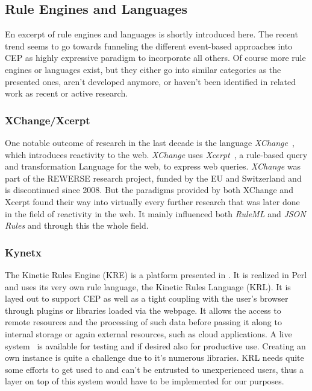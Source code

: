 \documentclass[11pt]{article}%
\begin{document}
\subsection{Rule Engines and Languages}
En excerpt of rule engines and languages is shortly introduced here. The recent trend seems to go towards funneling the different event-based approaches into CEP as highly expressive paradigm to incorporate all others. Of course more rule engines or languages exist, but they either go into similar categories as the presented ones, aren't developed anymore, or haven't been identified in related work as recent or active research.

\subsubsection{XChange/Xcerpt}
One notable outcome of research in the last decade is the language \emph{XChange}~\cite{2005-Patranjan-TLE.pdf,2005-Bry_etal-XChange.pdf}, which introduces reactivity to the web. \emph{XChange} uses \emph{Xcerpt}~\cite{2004-Schaffert-Xcerpt.pdf}, a rule-based query and transformation Language for the web, to express web queries.
\emph{XChange} was part of the REWERSE research project, funded by the EU and Switzerland and is discontinued since 2008. But the paradigms provided by both XChange and Xcerpt found their way into virtually every further research that was later done in the field of reactivity in the web. It mainly influenced both \emph{RuleML} and \emph{JSON Rules} and through this the whole field. 

\subsubsection{Kynetx}
The Kinetic Rules Engine (KRE) is a platform presented in \cite{bookTheLiveWeb}. It is realized in Perl and uses its very own rule language, the Kinetic Rules Language (KRL). It is layed out to support CEP as well as a tight coupling with the user's browser through plugins or libraries loaded via the webpage. It allows the access to remote resources and the processing of such data before passing it along to internal storage or again external resources, such as cloud applications. A live system~\cite{wwwkynetx} is available for testing and if desired also for productive use. Creating an own instance is quite a challenge due to it's numerous libraries. KRL needs quite some efforts to get used to and can't be entrusted to unexperienced users, thus a layer on top of this system would have to be implemented for our purposes.
\end{document}
